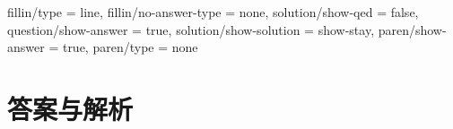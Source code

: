 
\examsetup
{
    fillin/type = line,
    fillin/no-answer-type = none,
    solution/show-qed = false,
    question/show-answer = true,
    solution/show-solution = show-stay,
    paren/show-answer = true,
    paren/type = none
}

\chapter{答案与解析}
